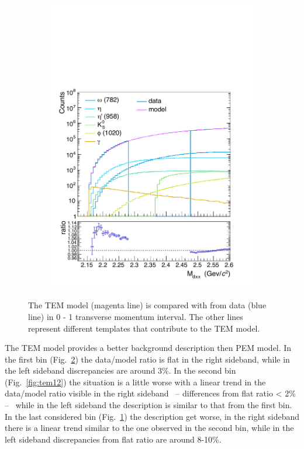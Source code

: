 \begin{figure} [htb]
\begin{subfigure}{.33\textwidth}
  \includegraphics[width=\linewidth]{gfx/can2}
  \caption{}
  \label{fig:tem23}
\end{subfigure}
\caption{The TEM model (magenta line) is compared with \minv from data (blue line) in 0 - 1 \gevc transverse momentum interval. The other lines represent different templates that contribute to the TEM model.}
\label{fig:tem01}
\end{figure}

The TEM model provides a better background description then PEM model. In the first \pt bin
(Fig.~\ref{fig:tem01}) the data/model ratio is flat in the right sideband, while in the left sideband 
discrepancies are around 3\%. In the second bin (Fig.~\ref{fig:tem12}) the situation is a little worse
with a linear trend in the data/model ratio visible in the right sideband \ -- differences from flat
ratio < 2\% -- \ while in the left sideband the description is similar to that from the first bin. 
In the last considered bin (Fig.~\ref{fig:tem23}) the description get worse, in the right sideband
there is a linear trend similar to the one observed in the second bin, while in the left sideband 
discrepancies from flat ratio are around 8-10\%.

